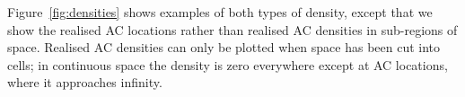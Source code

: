 \documentclass[useAMS,usenatbib,referee]{biom}
\begin{document}
Figure~\ref{fig:densities} shows examples of both types of density, except that we show the realised AC locations rather than realised AC densities in sub-regions of space. Realised AC densities can only be plotted when space has been cut into cells; in continuous space the density is zero everywhere except at AC locations, where it approaches infinity.
\end{document}
